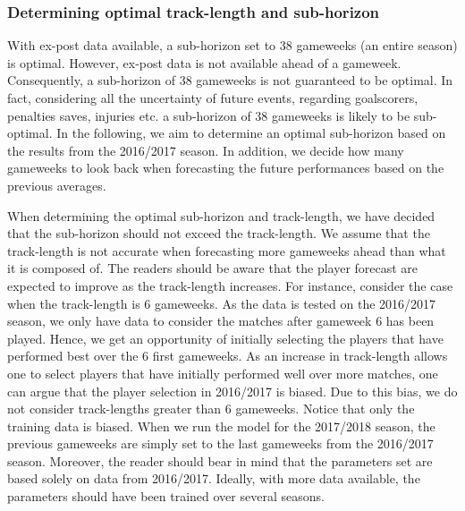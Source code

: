\subsubsection{Determining optimal track-length and sub-horizon}

With ex-post data available, a sub-horizon set to 38 gameweeks (an entire season) is optimal. However, ex-post data is not available ahead of a gameweek. Consequently, a sub-horizon of 38 gameweeks is not guaranteed to be optimal. In fact, considering all the uncertainty of future events, regarding goalscorers, penalties saves, injuries etc. a sub-horizon of 38 gameweeks is likely to be sub-optimal. In the following, we aim to determine an optimal sub-horizon based on the results from the 2016/2017 season. In addition, we decide how many gameweeks to look back when forecasting the future performances based on the previous averages.

\newpar

When determining the optimal sub-horizon and track-length, we have decided that the sub-horizon should not exceed the track-length. We assume that the track-length is not accurate when forecasting more gameweeks ahead than what it is composed of. The readers should be aware that the player forecast are expected to improve as the track-length increases. For instance, consider the case when the track-length is 6 gameweeks. As the data is tested on the 2016/2017 season, we only have data to consider the matches after gameweek 6 has been played. Hence, we get an opportunity of initially selecting the players that have performed best over the 6 first gameweeks. As an increase in track-length allows one to select players that have initially performed well over more matches, one can argue that the player selection in 2016/2017 is biased. Due to this bias, we do not consider track-lengths greater than 6 gameweeks. Notice that only the training data is biased. When we run the model for the 2017/2018 season, the previous gameweeks are simply set to the last gameweeks from the 2016/2017 season. Moreover, the reader should bear in mind that the parameters set are based solely on data from 2016/2017. Ideally, with more data available, the parameters should have been trained over several seasons.




